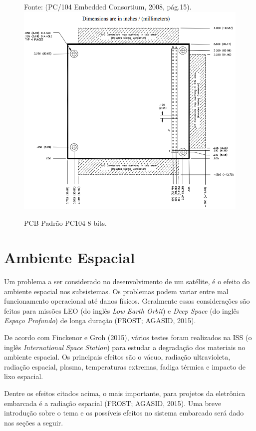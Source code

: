 \begin{figure}[h]
\footnotesize{
	\centering
	Fonte: (PC/104 Embedded Consortium, 2008, pág.15).\linebreak	
	\includegraphics[keepaspectratio=true,scale=0.55]{figuras/pc104.PNG}
	\caption{ PCB Padrão PC104 8-bits.}
	\label{fig16}
}
\end{figure}
\FloatBarrier

\section{Ambiente Espacial}
Um problema a ser considerado no desenvolvimento de um satélite, é o efeito do ambiente espacial nos subsistemas. Os problemas podem variar entre mal funcionamento operacional até danos físicos. Geralmente essas considerações são feitas para missões LEO (do inglês \textit{Low Earth Orbit}) e \textit{Deep Space} (do inglês \textit{Espaço Profundo}) de longa duração (FROST; AGASID, 2015).

De acordo com Finckenor e Groh (2015), vários testes foram realizados na ISS (o inglês \textit{International Space Station}) para estudar a degradação dos materiais no ambiente espacial. Os principais efeitos são o vácuo, radiação ultravioleta, radiação espacial, plasma, temperaturas extremas, fadiga térmica e impacto de lixo espacial. 

Dentre os efeitos citados acima, o mais importante, para projetos da eletrônica embarcada é a radiação espacial (FROST; AGASID, 2015). Uma breve introdução sobre o tema e os possíveis efeitos no sistema embarcado será dado nas seções a seguir.

